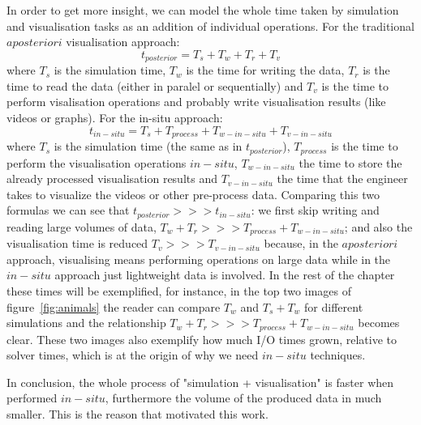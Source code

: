 In order to get more insight, we can model the whole time taken by simulation
and visualisation tasks as an addition of individual operations. For the
traditional $a posteriori$ visualisation approach:
\[
  t_{posterior} = T_s + T_w  + T_r + T_v
\]
where $T_s$ is the simulation time, $T_w$ is the time for writing the data,
$T_r$ is the time to read the data (either in paralel or sequentially) and $T_v$
is the time to perform visalisation operations and probably write visualisation
results (like videos or graphs). For the in-situ approach:
\[
t_{in-situ} = T_s + T_{process} + T_{w-in-situ} + T_{v-in-situ}
\]
where $T_s$ is the simulation time (the same as in $t_{posterior}$),
$T_{process}$
is the time to perform the visualisation operations $in-situ$, $T_{w-in-situ}$
the time to store the already processed visualisation results and
$T_{v-in-situ}$ the time that the engineer takes to visualize the videos or
other pre-process data. Comparing this two formulas we can see that
$t_{posterior} >>> t_{in-situ}$: we first skip writing and reading large volumes
of data, $T_w  + T_r >>> T_{process} + T_{w-in-situ}$; and also the
visualisation time is reduced $T_v >>> T_{v-in-situ}$ because, in the $a
posteriori$ approach, visualising means performing operations on large data
while in the $in-situ$ approach just lightweight data is involved.  In the rest
of the chapter these times will be exemplified, for instance, in the top two
images of figure~\ref{fig:animals} the reader can compare $T_w$ and $T_s + T_w$ for different
simulations and the relationship $T_w  + T_r >>> T_{process} + T_{w-in-situ}$
becomes clear. These two images also exemplify how much I/O times grown,
relative to solver times, which is at the origin of why we need $in-situ$
techniques.

In conclusion, the whole process of "simulation + visualisation" is faster when
performed $in-situ$, furthermore the volume of the produced data in much
smaller. This is the reason that motivated this work.




